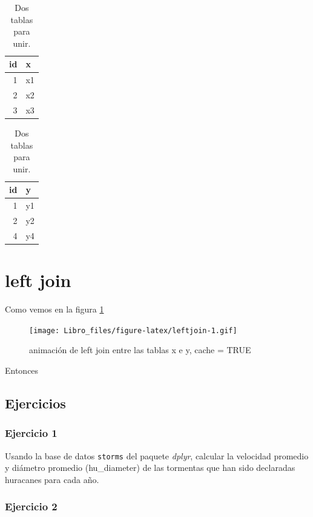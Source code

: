\documentclass[]{book}
\begin{document}
\begin{table}
\caption{\label{tab:DosTablas}Dos tablas para unir.}

\centering
\begin{tabular}[t]{rl}
\toprule
id & x\\
\midrule
1 & x1\\
2 & x2\\
3 & x3\\
\bottomrule
\end{tabular}
\centering
\begin{tabular}[t]{rl}
\toprule
id & y\\
\midrule
1 & y1\\
2 & y2\\
4 & y4\\
\bottomrule
\end{tabular}
\end{table}

\hypertarget{left-join}{%
\section{left join}\label{left-join}}

Como vemos en la figura \ref{fig:leftjoin}

\begin{figure}
\centering
\texttt{[image: Libro\_files/figure-latex/leftjoin-1.gif]}
\caption{\label{fig:leftjoin}animación de left join entre las tablas x e y,
cache = TRUE}
\end{figure}

Entonces

\hypertarget{ejercicios}{%
\subsection{Ejercicios}\label{ejercicios}}

\hypertarget{ejercicio-1}{%
\subsubsection{Ejercicio 1}\label{ejercicio-1}}

Usando la base de datos \texttt{storms} del paquete \emph{dplyr},
calcular la velocidad promedio y diámetro promedio (hu\_diameter) de las
tormentas que han sido declaradas huracanes para cada año.

\hypertarget{ejercicio-2}{%
\subsubsection{Ejercicio 2}\label{ejercicio-2}}
\end{document}

